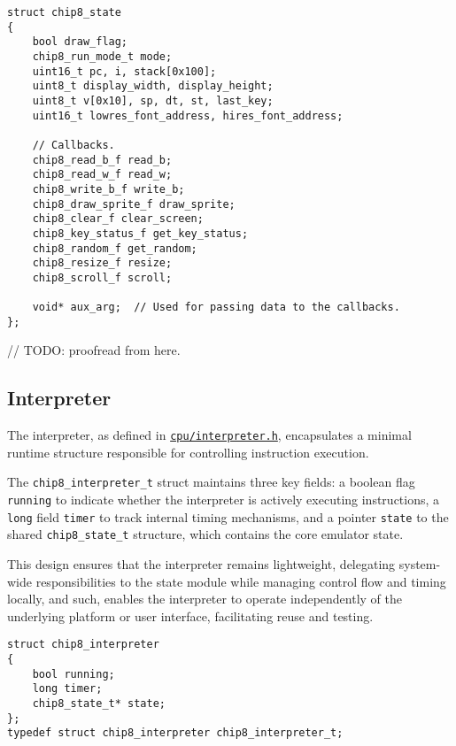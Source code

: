\begin{verbatim}
struct chip8_state
{
    bool draw_flag;
    chip8_run_mode_t mode;
    uint16_t pc, i, stack[0x100];
    uint8_t display_width, display_height;
    uint8_t v[0x10], sp, dt, st, last_key;
    uint16_t lowres_font_address, hires_font_address;
    
    // Callbacks.
    chip8_read_b_f read_b;
    chip8_read_w_f read_w;
    chip8_write_b_f write_b;
    chip8_draw_sprite_f draw_sprite;
    chip8_clear_f clear_screen;
    chip8_key_status_f get_key_status;
    chip8_random_f get_random;
    chip8_resize_f resize;
    chip8_scroll_f scroll;
    
    void* aux_arg;  // Used for passing data to the callbacks.
};
\end{verbatim}

// TODO: proofread from here.

\subsection{Interpreter}
\label{subsec:ch3sec3sub1}

\par The interpreter, as defined in \href{https://github.com/solomonarul/cchip8/blob/main/inc/cchip8/cpu/interpreter.h}{\texttt{cpu/interpreter.h}}, encapsulates a minimal runtime structure responsible for controlling instruction execution.

\par The \texttt{chip8\_interpreter\_t} struct maintains three key fields: a boolean flag \texttt{running} to indicate whether the interpreter is actively executing instructions, a \texttt{long} field \texttt{timer} to track internal timing mechanisms, and a pointer \texttt{state} to the shared \texttt{chip8\_state\_t} structure, which contains the core emulator state.

\par This design ensures that the interpreter remains lightweight, delegating system-wide responsibilities to the state module while managing control flow and timing locally, and such, enables the interpreter to operate independently of the underlying platform or user interface, facilitating reuse and testing.

\begin{verbatim}
struct chip8_interpreter
{
    bool running;
    long timer;
    chip8_state_t* state;
};
typedef struct chip8_interpreter chip8_interpreter_t;
\end{verbatim}

